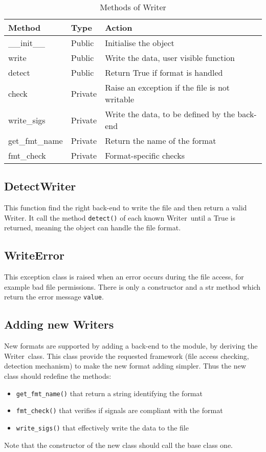 \documentclass[a4paper,11pt]{article}
\newcommand{\att}[1]{\texttt{#1}}
\newcommand{\meth}[1]{\texttt{#1()}}
\newcommand{\cls}[1]{\textsf{#1}}
\newcommand{\wrt}{\cls{Writer}}
\begin{document}
\begin{table}[htbp]
  \centering\sf\small
  \begin{tabular}{lll}
    \hline
    Method & Type & Action \\
    \hline
    \_\_init\_\_ & Public & Initialise the object \\
    write        & Public & Write the data, user visible function\\
    detect       & Public & Return True if format is handled\\
    check        & Private& Raise an exception if the file is not writable\\
    write\_sigs  & Private& Write the data, to be defined by the back-end\\
    get\_fmt\_name&Private& Return the name of the format\\
    fmt\_check   & Private& Format-specific checks\\
    \hline
  \end{tabular}
  \caption{Methods of \wrt}
  \label{tab:wrts:meth}
\end{table}

\subsection{DetectWriter}
This function find the right back-end to write the file and then return a valid \wrt.
It call the method \meth{detect} of each known \wrt\ until a True is returned, meaning the object can handle the file format.

\subsection{WriteError}
This exception class is raised when an error occurs during the file access, for example bad file permissions.
There is only a constructor and a str method which return the error message \att{value}.

\subsection{Adding new Writers}
New formats are supported by adding a back-end to the module, by deriving the \wrt\ class.
This class provide the requested framework (file access checking, detection mechanism) to make the new format adding simpler.
Thus the new class should redefine the methods:
\begin{itemize}
\item \meth{get\_fmt\_name} that return a string identifying the format
\item \meth{fmt\_check} that verifies if signals are compliant with the format
\item \meth{write\_sigs} that effectively write the data to the file
\end{itemize}
Note that the constructor of the new class should call the base class one.
\end{document}
